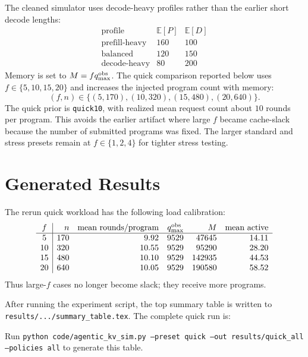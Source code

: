\documentclass[11pt]{article}
\newcommand{\E}{\mathbb E}
\begin{document}
The cleaned simulator uses decode-heavy profiles rather than the earlier short
decode lengths:
\[
\begin{array}{c|cc}
\text{profile} & \E[P] & \E[D]\\
\hline
\text{prefill-heavy} & 160 & 100\\
\text{balanced} & 120 & 150\\
\text{decode-heavy} & 80 & 200
\end{array}
\]
Memory is set to $M=fq_{\max}^{\rm obs}$.  The quick comparison reported below
uses $f\in\{5,10,15,20\}$ and increases the injected program count with memory:
\[
    (f,n)\in\{(5,170),(10,320),(15,480),(20,640)\}.
\]
The quick prior is \texttt{quick10}, with realized mean request count about
$10$ rounds per program.  This avoids the earlier artifact where large $f$
became cache-slack because the number of submitted programs was fixed.  The
larger standard and stress presets remain at $f\in\{1,2,4\}$ for tighter stress
testing.

\section{Generated Results}

The rerun quick workload has the following load calibration:
\[
\begin{array}{c|rrrrr}
f & n & \text{mean rounds/program} & q_{\max}^{\rm obs} & M & \text{mean active}\\
\hline
5 & 170 & 9.92 & 9529 & 47645 & 14.11\\
10 & 320 & 10.55 & 9529 & 95290 & 28.20\\
15 & 480 & 10.10 & 9529 & 142935 & 44.53\\
20 & 640 & 10.05 & 9529 & 190580 & 58.52
\end{array}
\]
Thus large-$f$ cases no longer become slack; they receive more programs.

After running the experiment script, the top summary table is written to
\texttt{results/.../summary\_table.tex}.  The complete quick run is:

\begin{center}
{}
 {
  {}
  {Run \texttt{python code/agentic\_kv\_sim.py --preset quick --out results/quick\_all --policies all} to generate this table.}}
\end{center}
\end{document}
